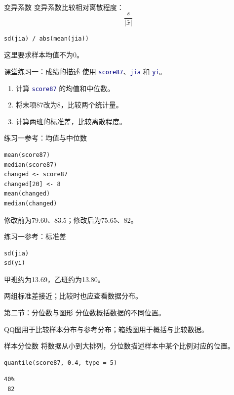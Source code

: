 \documentclass[14pt,compress,t,noamsthm,notheorem,table,handout,fontset=none]{ctexbeamer}
\newcommand{\code}[1]{\textcolor{navy}{\texttt{#1}}}
\newcommand{\outputlabel}{\par\smallskip{\fontsize{10.5}{13}\selectfont\bfseries\color{muted}Console 输出\par}}
\begin{document}
\begin{frame}[fragile]{变异系数}
  变异系数比较相对离散程度：
\[
  \frac{s}{|\bar{x}|}
\]
\begin{lstlisting}
sd(jia) / abs(mean(jia))
\end{lstlisting}
  这里要求样本均值不为0。
\end{frame}
\begin{frame}{课堂练习一：成绩的描述}
  使用 \code{score87}、\code{jia} 和 \code{yi}。
  \begin{enumerate}
    \item 计算 \code{score87} 的均值和中位数。
    \item 将末项87改为8，比较两个统计量。
    \item 计算两班的标准差，比较离散程度。
  \end{enumerate}
\end{frame}
\begin{frame}[fragile]{练习一参考：均值与中位数}
\begin{lstlisting}
mean(score87)
median(score87)
changed <- score87
changed[20] <- 8
mean(changed)
median(changed)
\end{lstlisting}
  修改前为79.60、83.5；修改后为75.65、82。
\end{frame}
\begin{frame}[fragile]{练习一参考：标准差}
\begin{lstlisting}
sd(jia)
sd(yi)
\end{lstlisting}
  甲班约为13.69，乙班约为13.80。
  \par\medskip
  两组标准差接近；比较时也应查看数据分布。
\end{frame}
\begin{frame}{第二节：分位数与图形}
  分位数概括数据的不同位置。
  \par\medskip
  QQ图用于比较样本分布与参考分布；箱线图用于概括与比较数据。
\end{frame}
\begin{frame}[fragile]{样本分位数}
  将数据从小到大排列，分位数描述样本中某个比例对应的位置。
\begin{lstlisting}
quantile(score87, 0.4, type = 5)
\end{lstlisting}
\outputlabel
\begin{lstlisting}[style=output]
40%
 82
\end{lstlisting}
\end{frame}
\end{document}
